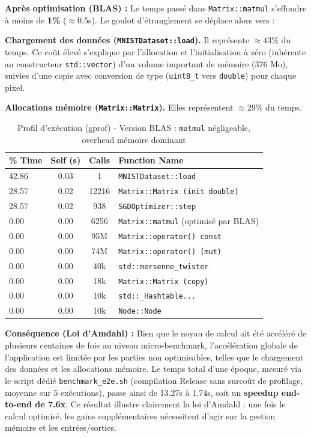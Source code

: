 \documentclass[a4paper,11pt]{article}
\begin{document}
\textbf{Après optimisation (BLAS) :}
Le temps passé dans \texttt{Matrix::matmul} s'effondre à moins de \textbf{1\%} ($\approx 0.5$s). Le goulot d'étranglement se déplace alors vers :
\par\smallskip
\noindent\textbf{Chargement des données (\texttt{MNISTDataset::load}).} Il représente $\approx 43\%$ du temps. Ce coût élevé s'explique par l'allocation et l'initialisation à zéro (inhérente au constructeur \texttt{std::vector}) d'un volume important de mémoire (376 Mo), suivies d'une copie avec conversion de type (\texttt{uint8\_t} vers \texttt{double}) pour chaque pixel.
\par\smallskip
\noindent\textbf{Allocations mémoire (\texttt{Matrix::Matrix}).} Elles représentent $\approx 29\%$ du temps.

\begin{table}[H]
    \centering
    \caption{Profil d'exécution (gprof) - Version BLAS : \texttt{matmul} négligeable, overhead mémoire dominant}
    \label{tab:gprof_blas}
    \begin{tabular}{lccl}
        \toprule
        \textbf{\% Time} & \textbf{Self (s)} & \textbf{Calls} & \textbf{Function Name} \\
        \midrule
        42.86 & 0.03 & 1 & \texttt{MNISTDataset::load} \\
        28.57 & 0.02 & 12216 & \texttt{Matrix::Matrix (init double)} \\
        28.57 & 0.02 & 938 & \texttt{SGDOptimizer::step} \\
        0.00 & 0.00 & 6256 & \texttt{Matrix::matmul} (optimisé par BLAS) \\
        0.00 & 0.00 & 95M & \texttt{Matrix::operator() const} \\
        0.00 & 0.00 & 74M & \texttt{Matrix::operator() (mut)} \\
        0.00 & 0.00 & 40k & \texttt{std::mersenne\_twister} \\
        0.00 & 0.00 & 18k & \texttt{Matrix::Matrix (copy)} \\
        0.00 & 0.00 & 10k & \texttt{std::\_Hashtable...} \\
        0.00 & 0.00 & 10k & \texttt{Node::Node} \\
        \bottomrule
    \end{tabular}
\end{table}

\textbf{Conséquence (Loi d'Amdahl) :}
Bien que le noyau de calcul ait été accéléré de plusieurs centaines de fois au niveau micro-benchmark, l'accélération globale de l'application est limitée par les parties non optimisables, telles que le chargement des données et les allocations mémoire. Le temps total d'une époque, mesuré via le script dédié \texttt{benchmark\_e2e.sh} (compilation Release sans surcoût de profilage, moyenne sur 5 exécutions), passe ainsi de 13.27s à 1.74s, soit un \textbf{speedup end-to-end de 7.6x}. Ce résultat illustre clairement la loi d'Amdahl \cite{amdahl1967} : une fois le calcul optimisé, les gains supplémentaires nécessitent d'agir sur la gestion mémoire et les entrées/sorties.
\end{document}
